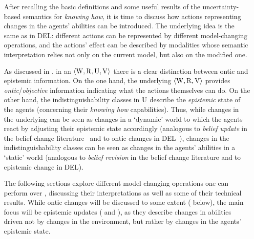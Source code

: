 After recalling the basic definitions and some useful results of the uncertainty-based semantics for \emph{knowing how}, it is time to discuss how actions representing changes in the agents' abilities can be introduced. The underlying idea is the same as in DEL: different actions can be represented by different model-changing operations, and the actions' effect can be described by modalities whose semantic interpretation relies not only on the current model, but also on the modified one. 

\medskip

As discussed in \cite{AFSVQ23report}, in an \ults $\langle \operatorname{W},\operatorname{R},\operatorname{U},\operatorname{V} \rangle$ there is a clear distinction between ontic and epistemic information. On the one hand, the underlying \lts $\langle \operatorname{W},\operatorname{R},\operatorname{V} \rangle$ provides \emph{ontic}/\emph{objective} information indicating what the actions themselves can do. On the other hand, the indistinguishability classes in $\operatorname{U}$ describe the \emph{epistemic} state of the agents (concerning their \emph{knowing how} capabilities). Thus, while changes in the underlying \lts can be seen as changes in a `dynamic' world to which the agents react by adjusting their epistemic state accordingly (analogous to  \emph{belief update} in the belief change literature~\cite{sep-logic-belief-revision} and to ontic changes in DEL~\cite{vanDitmarschKooi2008}), changes in the indistinguishability classes can be seen as changes in the agents' abilities in a `static' world (analogous to \emph{belief revision} in the belief change literature and to epistemic change in DEL).

\smallskip

The following sections explore different model-changing operations one can perform over \ultss, discussing their interpretations as well as some of their technical results. While ontic changes will be discussed to some extent ( below), the main focus will be epistemic updates ( and ), as they describe changes in abilities driven not by changes in the environment, but rather by changes in the agents' epistemic state.




